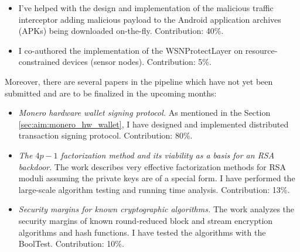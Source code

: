 \documentclass[
  digital, %
  twoside, %
  table,   %
  lof,     %
  lot,     %
]{fithesis3}
\theoremstyle{definition}
\theoremstyle{remark}
\begin{document}
\begin{itemize}
	\item {}
	I've helped with the design and implementation of the malicious traffic interceptor adding malicious payload to the Android application archives (APKs) being downloaded on-the-fly. Contribution: 40\%.
	
	\item {}
	I co-authored the implementation of the WSNProtectLayer on resource-constrained devices (sensor nodes). Contribution: 5\%.
\end{itemize}

Moreover, there are several papers in the pipeline which have not yet been submitted and are to be finalized in the upcoming months:

\begin{itemize}
	\item \emph{Monero hardware wallet signing protocol.} As mentioned in the Section \ref{sec:aim:monero_hw_wallet}, I have designed and implemented distributed transaction signing protocol. Contribution: 80\%.
	
	\item \emph{The $4p-1$ factorization method and its viability as a basis for an RSA backdoor}. The work describes very effective factorization methods for RSA moduli assuming the private keys are of a special form. I have performed the large-scale algorithm testing and running time analysis. Contribution: 13\%.
	
	\item \emph{Security margins for known cryptographic algorithms.} The work analyzes the security margins of known round-reduced block and stream encryption algorithms and hash functions. I have tested the algorithms with the BoolTest. Contribution: 10\%.	
\end{itemize}

%	
%	
%	
\end{document}
